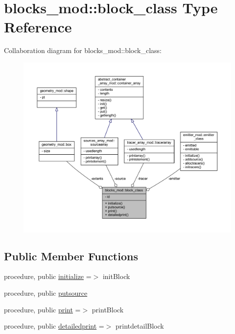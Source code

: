 \hypertarget{structblocks__mod_1_1block__class}{}\section{blocks\+\_\+mod\+:\+:block\+\_\+class Type Reference}
\label{structblocks__mod_1_1block__class}


Collaboration diagram for blocks\+\_\+mod\+:\+:block\+\_\+class\+:\nopagebreak
\begin{figure}[H]
\begin{center}
\leavevmode
\includegraphics[width=350pt]{structblocks__mod_1_1block__class__coll__graph}
\end{center}
\end{figure}
\subsection*{Public Member Functions}
\begin{DoxyCompactItemize}
\item 
procedure, public \mbox{\hyperlink{structblocks__mod_1_1block__class_ad671745ca5dc3227ddb0ed1d9ff45268}{initialize}} =$>$ init\+Block
\item 
procedure, public \mbox{\hyperlink{structblocks__mod_1_1block__class_ac79980e841902691a06212dce50f6331}{putsource}}
\item 
procedure, public \mbox{\hyperlink{structblocks__mod_1_1block__class_a43b4c133934eaadb55d30cf834d1e28c}{print}} =$>$ print\+Block
\item 
procedure, public \mbox{\hyperlink{structblocks__mod_1_1block__class_a937d8dca8393460bc718dafa8a5c03ac}{detailedprint}} =$>$ printdetail\+Block
\end{DoxyCompactItemize}
